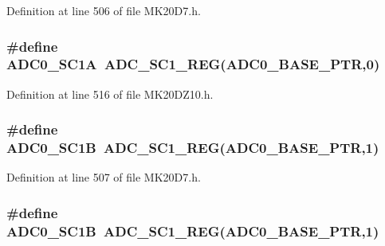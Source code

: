 Definition at line 506 of file M\+K20\+D7.\+h.

\subsubsection[{\texorpdfstring{A\+D\+C0\+\_\+\+S\+C1A}{ADC0_SC1A}}]{\setlength{\rightskip}{0pt plus 5cm}\#define A\+D\+C0\+\_\+\+S\+C1A~{\bf A\+D\+C\+\_\+\+S\+C1\+\_\+\+R\+EG}({\bf A\+D\+C0\+\_\+\+B\+A\+S\+E\+\_\+\+P\+TR},0)}\hypertarget{group___a_d_c___register___accessor___macros_ga4ec61cea717b410cadc80c71f4c81664}{}\label{group___a_d_c___register___accessor___macros_ga4ec61cea717b410cadc80c71f4c81664}


Definition at line 516 of file M\+K20\+D\+Z10.\+h.

\subsubsection[{\texorpdfstring{A\+D\+C0\+\_\+\+S\+C1B}{ADC0_SC1B}}]{\setlength{\rightskip}{0pt plus 5cm}\#define A\+D\+C0\+\_\+\+S\+C1B~{\bf A\+D\+C\+\_\+\+S\+C1\+\_\+\+R\+EG}({\bf A\+D\+C0\+\_\+\+B\+A\+S\+E\+\_\+\+P\+TR},1)}\hypertarget{group___a_d_c___register___accessor___macros_ga9a83b6b66f4db147b1c3f952e62b57d5}{}\label{group___a_d_c___register___accessor___macros_ga9a83b6b66f4db147b1c3f952e62b57d5}


Definition at line 507 of file M\+K20\+D7.\+h.

\subsubsection[{\texorpdfstring{A\+D\+C0\+\_\+\+S\+C1B}{ADC0_SC1B}}]{\setlength{\rightskip}{0pt plus 5cm}\#define A\+D\+C0\+\_\+\+S\+C1B~{\bf A\+D\+C\+\_\+\+S\+C1\+\_\+\+R\+EG}({\bf A\+D\+C0\+\_\+\+B\+A\+S\+E\+\_\+\+P\+TR},1)}\hypertarget{group___a_d_c___register___accessor___macros_ga9a83b6b66f4db147b1c3f952e62b57d5}{}\label{group___a_d_c___register___accessor___macros_ga9a83b6b66f4db147b1c3f952e62b57d5}


